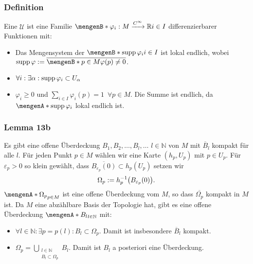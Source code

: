 \subsubsection[Definition: Untergeordnete Teilung der Eins]{Definition} %
\label{ssub:312}
Eine $\mathcal{U}$  ist eine Familie $\set[\varphi_i : M \xrightarrow{C^\infty} \mathds{R}]{i \in I} $ differenzierbarer Funktionen
mit:
\begin{itemize}
	\item Das Mengensystem der  $\set[\supp \varphi_i]{i \in I} $ ist lokal endlich, wobei $\supp \varphi := \overline{\set[p \in M]{\varphi(p) \not= 0}}$.
	\item $\forall i : \exists \alpha : \operatorname{supp} \varphi_i \subset U_\alpha$
	\item $\varphi_i \ge 0$ und $\sum_{i \in I} \varphi_i(p) = 1 \enspace \forall p \in M$. Die Summe ist endlich, da $\set{\supp \varphi_i}$ lokal endlich ist.
\end{itemize}

\subsubsection{Lemma 13b} %
\label{ssub:313}
Es gibt eine offene Überdeckung $B_1, B_2, \ldots , B_l , \ldots $ $l \in \mathds{N}$ von $M$ mit $\overline{B}_l$ kompakt für alle $l$.
Für jeden Punkt $p \in M$ wählen wir eine Karte $(h_p,U_p)$ mit $p \in U_p$. Für $\varepsilon_p >0$ so klein gewählt, dass 
\(
	\overline{B_{\varepsilon_p}(0)} \subset h_p(U_p)
\)
setzen wir 
\[
	\Omega_p := h_p ^{-1} \enbrace*{B_{\varepsilon_p}(0)}.
\]
$\set{\Omega_p}_{p \in M}$ ist eine offene Überdeckung vom $M$, so dass $\overline{\Omega_p}$ kompakt in $M$ ist. Da $M$ eine abzählbare Basis der Topologie hat, gibt es 
eine offene Überdeckung $\set{B_l}_{l \in \mathds{N}}$ mit:
\begin{itemize}
	\item $\forall l \in \mathds{N} : \exists p=p(l) : B_l \subset \Omega_p$. Damit ist insbesondere $\overline{B}_l$ kompakt.
	\item $\Omega_p = \bigcup_{\substack{l \in \mathds{N} \\ B_l \subset \Omega_p}} B_l$. Damit ist $B_l$ a posteriori eine Überdeckung. \bewende
\end{itemize}

